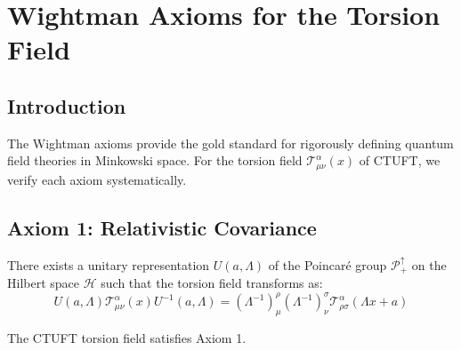 \section{Wightman Axioms for the Torsion Field}
\label{sec:wightman}

\subsection{Introduction}

The Wightman axioms \cite{wightman1964} provide the gold standard for rigorously defining quantum field theories in Minkowski space. For the torsion field $\mathcal{T}^\alpha_{\mu\nu}(x)$ of CTUFT, we verify each axiom systematically.

\subsection{Axiom 1: Relativistic Covariance}

\begin{axiom}
There exists a unitary representation $U(a, \Lambda)$ of the Poincar\'{e} group $\mathcal{P}_+^\uparrow$ on the Hilbert space $\mathcal{H}$ such that the torsion field transforms as:
\begin{equation}
    U(a, \Lambda) \mathcal{T}^\alpha_{\mu\nu}(x) U^{-1}(a, \Lambda) = (\Lambda^{-1})^\rho_\mu (\Lambda^{-1})^\sigma_\nu \mathcal{T}^\alpha_{\rho\sigma}(\Lambda x + a)
\end{equation}
\end{axiom}

\begin{theorem}
The CTUFT torsion field satisfies Axiom 1.
\end{theorem}

